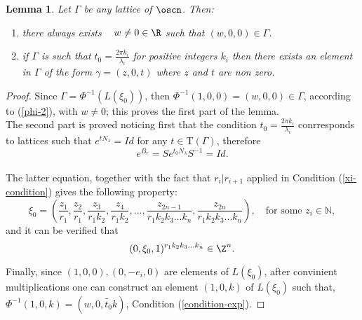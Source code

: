 \documentclass[11pt]{amsart}
\theoremstyle{plain}
\newtheorem{lem}[thm]{Lemma}
\theoremstyle{definition}
\theoremstyle{remark}
\begin{document}
\begin{lem}\cite{MF}\label{oscilador-elementos}  %
	Let $\Gamma$ be any lattice of $\oscn$. Then:
	\begin{enumerate}
	    \item there always exists \,\,\, $w \neq 0 \in \R$ such that $(w,0,0) \in \Gamma$.
	    \item if $\Gamma$ is such that $t_0 = \frac{2 \pi k_i}{\lambda_i}$ for positive integers $k_i$ then there exists an element in $\Gamma$ of the form $\gamma = (z, 0, t)$ where $z$ and $t$ are non zero.
	\end{enumerate}
\end{lem} 

\begin{proof}

Since $\Gamma = \Phi^{-1}(L(\xi_0))$, then $\Phi^{-1}(1,0,0) = (w,0,0) \in \Gamma$, according to (\ref{phi-2}), with $w \neq 0 $; this proves the first part of the lemma.\\

The second part is proved noticing first that the condition $t_0 = \frac{2 \pi k_i}{\lambda_i}$ conrresponds to lattices such that $e^{tN_\lambda} = Id$ for any $t \in \mathrm{T}(\Gamma)$, therefore $$e^{B_r} = Se^{t_0N_\lambda}S^{-1}=Id.$$ \\

The latter equation, together with the fact that $r_i | r_{i+1}$ applied in Condition (\ref{xi-condition}) gives the following property: $$\xi_0=(\frac{z_1}{r_1},\frac{z_2}{r_1}, \frac{z_3}{r_1 k_2}, \frac{z_4}{r_1 k_2}, ..., \frac{z_{2n-1}}{r_1 k_2 k_3 ... k_n}, \frac{z_{2n}}{r_1 k_2 k_3 ... k_n} ), \quad \mbox{for some } z_i \in \mathbb{N},$$ and it can be verified that $$(0,\xi_0,1)^{r_1 k_2 k_3 ... k_n} \in \Z^n. $$

Finally, since $(1,0,0), (0,-e_i,0)$ are elements of $L(\xi_0)$, after convinient multiplications one can construct an element $(1,0,k)$ of $L(\xi_0)$ such that, $\Phi^{-1}(1,0,k) = (w,0,\widetilde{t_0} k)$, Condition (\ref{condition-exp}). 

\end{proof}
\end{document}
